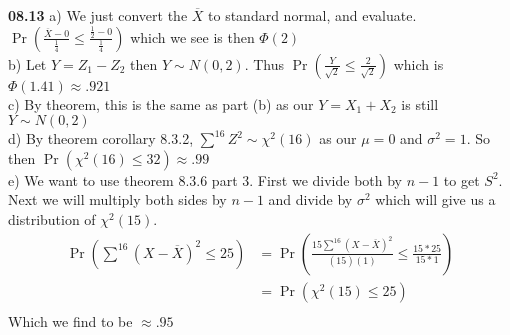 

{\bf 08.13} a) We just convert the $\overline{X}$ to standard normal, and evaluate. 
$\Pr \left( \frac{ \overline{X} - 0}{\frac{1}{4}} \leq \frac{\frac{1}{2} - 0}{\frac{1}{4}} \right) $ which
we see is then $\Phi \left( 2 \right)$ \\

b) Let $Y = Z_1 - Z_2$ then $Y \sim N(0,2)$. Thus $ \Pr \left( \frac{Y}{\sqrt{2}} \leq \frac{2}{\sqrt{2}} \right)$
which is $\Phi \left( 1.41 \right) \approx .921$ \\

c) By theorem, this is the same as part (b) as our $Y = X_1 + X_2$ is still $Y \sim N(0,2)$ \\

d) By theorem corollary 8.3.2, $\sum^{16} Z^{2} \sim \chi^2 (16)$ as our $\mu = 0$ and $\sigma^2 = 1$.
So then $\Pr \left( \chi^2 (16) \leq 32 \right) \approx .99$ \\

e) We want to use theorem 8.3.6 part 3. First we divide both by $n-1$ to get $S^2$. 
Next we will multiply both sides by $n-1$ and divide by $\sigma^2$ which
will give us a distribution of $\chi^2 (15)$. 
\begin{align*}
	\Pr \left( \sum^{16} (X - \overline{X})^2 \leq  25 \right) &= 
			\Pr \left( \frac{15 \sum^{16} (X - \overline{X})^2}{(15)(1)}  \leq \frac{15 * 25}{15 * 1} \right) \\
	& =  \Pr \left( \chi^2 (15) \leq 25 \right) \\
\end{align*}
Which we find to be $\approx .95$ \\


